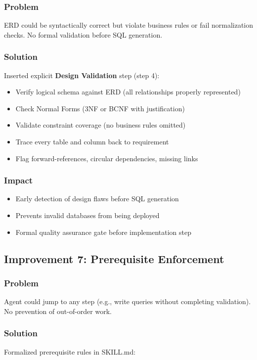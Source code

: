 \documentclass[12pt,a4paper]{article}
\begin{document}
\subsubsection{Problem}
ERD could be syntactically correct but violate business rules or fail normalization checks. No formal validation before SQL generation.

\subsubsection{Solution}
Inserted explicit \textbf{Design Validation} step (step 4):

\begin{itemize}
    \item Verify logical schema against ERD (all relationships properly represented)
    \item Check Normal Forms (3NF or BCNF with justification)
    \item Validate constraint coverage (no business rules omitted)
    \item Trace every table and column back to requirement
    \item Flag forward-references, circular dependencies, missing links
\end{itemize}

\subsubsection{Impact}
\begin{itemize}
    \item Early detection of design flaws before SQL generation
    \item Prevents invalid databases from being deployed
    \item Formal quality assurance gate before implementation step
\end{itemize}

\subsection{Improvement 7: Prerequisite Enforcement}

\subsubsection{Problem}
Agent could jump to any step (e.g., write queries without completing validation). No prevention of out-of-order work.

\subsubsection{Solution}
Formalized prerequisite rules in SKILL.md:
\end{document}

